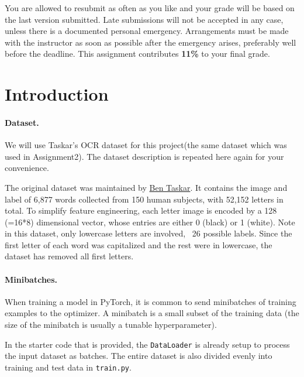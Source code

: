 \documentclass[11pt]{report}
\begin{document}
You are allowed to resubmit as often as you like and your grade will be based on the last version submitted.
Late submissions will not be accepted in any case, 
unless there is a documented personal emergency.  
Arrangements must be made with the instructor as soon as possible after the emergency arises,
preferably well before the deadline.
This assignment contributes {\bf 11\%} to your final grade.

\section{Introduction}
\label{sec:Introduction}

\paragraph{Dataset.}

We will use Taskar's OCR dataset for this project(the same dataset which was
used in Assignment2). The dataset description is repeated here again for your
convenience.


The original dataset was maintained by \href{https://en.wikipedia.org/wiki/Ben_Taskar}{Ben Taskar}.
It contains the image and label of 6,877 words collected from 150 human
subjects, with 52,152 letters in total. To simplify feature engineering, each
letter image is encoded by a 128 (=16*8) dimensional vector, whose entries are
either 0 (black) or 1 (white).
%
%
Note in this dataset, only lowercase letters are involved, \ie\ 26 possible
labels. Since the first letter of each word was capitalized and the rest were in
lowercase, the dataset has removed all first letters.



\paragraph{Minibatches.}
\label{par:Minibatches}
When training a model in PyTorch, it is common to send minibatches of training
examples to the optimizer. A minibatch is a small subset of the training data
(the size of the minibatch is usually a tunable hyperparameter).

In the starter code that is provided, the \texttt{DataLoader} is already setup
to process the input dataset as batches. The entire dataset is also divided
evenly into training and test data in \texttt{train.py}.
\end{document}
